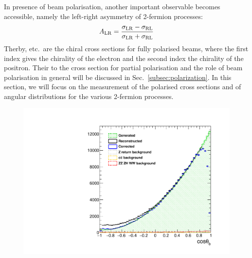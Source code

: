 In presence of beam polarisation, another important observable becomes accessible, namely the left-right asymmetry of 2-fermion processes:
\begin{equation}
A_{\mathrm{LR}} = \frac{\sigma_{\mathrm{LR}}-\sigma_{\mathrm{RL}}}{\sigma_{\mathrm{LR}}+\sigma_{\mathrm{RL}}}
\label{eq:defALR}
\end{equation}
Therby, \sigmaLR etc.\ are the chiral cross sections for fully polarised beams, where the first index gives the chirality of the electron and the second index the chirality of the positron. Their to the cross section for partial polarisation and the role of beam polarisation in general will be discussed in Sec.~\ref{subsec:polarization}. In this section, we will focus on the measurement of
the polarised cross sections and of angular distributions for the various 2-fermion processes.

\begin{figure}[hbt]
       \includegraphics[width=0.45\linewidth]{./chapters/figures/basymmetry-final-left.pdf}

\end{figure}
